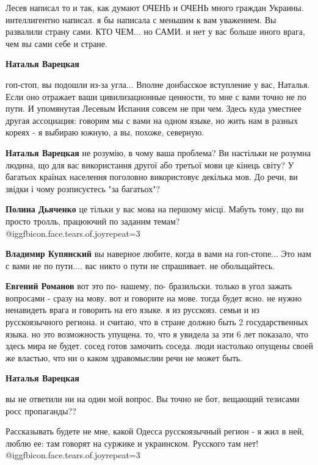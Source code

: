 \begin{itemize}
\begin{itemize}
Лесев написал то и так, как думают ОЧЕНЬ и ОЧЕНЬ много граждан Украины.
интеллигентно написал. я бы написала с меньшим к вам уважением. Вы развалили
страну сами. КТО ЧЕМ... но САМИ. и нет у вас больше иного врага, чем вы сами
себе и стране.


\textbf{Наталья Варецкая} 

гоп-стоп, вы подошли из-за угла... Вполне донбасское вступление у вас, Наталья.
Если оно отражает ваши цивилизационные ценности, то мне с вами точно не по
пути. И упомянутая Лесевым Испания совсем не при чем. Здесь куда уместнее
другая ассоциация: говорим мы с вами на одном языке, но жить нам в разных
кореях - я выбираю южную, а вы, похоже, северную.

\textbf{Наталья Варецкая} не розумію, в чому ваша проблема? Ви настільки не розумна людина, що для вас використання другої або третьої мови це кінець світу? У багатьох країнах населення поголовно використовує декілька мов. До речи, ви звідки і чому розписуєтесь "за багатьох"?

\textbf{Полина Дьяченко} це тільки у вас мова на першому місці. Мабуть тому, що ви просто тролль, працюючий по заданим темам?  @igg{fbicon.face.tears.of.joy}{repeat=3} 

\textbf{Владимир Купянский} вы наверное любите, когда в вами на гоп-стопе...
Это нам с вами не по пути.... вас никто о пути не спрашивает. не обольщайтесь.

\textbf{Евгений Романов} вот это по- нашему, по- бразильски. только в угол зажать вопросами - сразу на мову.
вот и говорите на мове. тогда будет ясно. не нужно ненавидеть врага и говорить на его языке.
я из русскояз. семьи и из русскоязычного региона. и считаю, что в стране должно быть 2 государственных языка.
но это возможность упущена. то, что я увидела за эти 6 лет показало, что здесь мира не будет. сосед готов замочить соседа. люди настолько опущены своей же властью, что ни о каком здравомыслии речи не может быть.

\textbf{Наталья Варецкая} 

вы не ответили ни на один мой вопрос. Вы точно не бот, вещающий тезисами росс
пропаганды??

Рассказывать будете не мне, какой Одесса русскоязычный регион - я жил в ней,
люблю ее: там говорят на суржике и украинском. Русского там нет!  @igg{fbicon.face.tears.of.joy}{repeat=3} 


\end{itemize}
\end{itemize}

